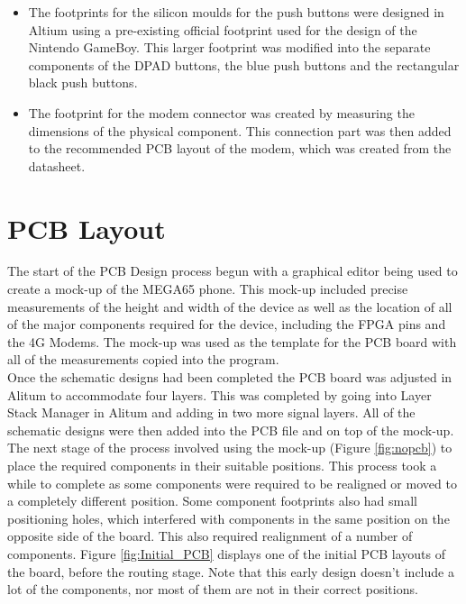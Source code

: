 \begin{itemize}
\item The footprints for the silicon moulds for the push buttons were designed in Altium using a pre-existing official footprint used for the design of the Nintendo GameBoy. 
This larger footprint was modified into the separate components of the DPAD buttons, the blue push buttons and the rectangular black push buttons.
\item The footprint for the modem connector was created by measuring the dimensions of the physical component. 
This connection part was then added to the recommended PCB layout of the modem, which was created from the datasheet. 
\end{itemize}


\section{PCB Layout}
\label{chap6sec5}

	The start of the PCB Design process begun with a graphical editor being used to create a mock-up of the MEGA65 phone. 
This mock-up included precise measurements of the height and width of the device as well as the location of all of the major components required for the device, including the FPGA pins and the 4G Modems. 
The mock-up was used as the template for the PCB board with all of the measurements copied into the program. \\
	Once the schematic designs had been completed the PCB board was adjusted in Alitum to accommodate four layers. 
This was completed by going into Layer Stack Manager in Alitum and adding in two more signal layers. 
All of the schematic designs were then added into the PCB file and on top of the mock-up. \\
The next stage of the process involved using the mock-up (Figure \ref{fig:nopcb}) to place the required components in their suitable positions. 
This process took a while to complete as some components were required to be realigned or moved to a completely different position. 
Some component footprints also had small positioning holes, which interfered with components in the same position on the opposite side of the board. 
This also required realignment of a number of components. 
Figure \ref{fig:Initial_PCB} displays one of the initial PCB layouts of the board, before the routing stage. 
Note that this early design doesn't include a lot of the components, nor most of them are not in their correct positions.\\

